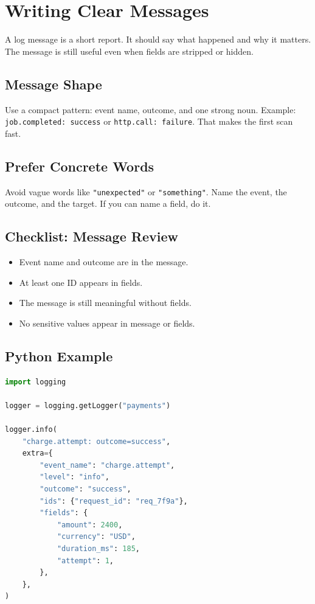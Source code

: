 \chapter{Writing Clear Messages}
A log message is a short report. It should say what happened and why it matters. The message is still useful even when fields are stripped or hidden.

\section{Message Shape}
Use a compact pattern: event name, outcome, and one strong noun. Example: \texttt{job.completed: success} or \texttt{http.call: failure}. That makes the first scan fast.

\section{Prefer Concrete Words}
Avoid vague words like \texttt{"unexpected"} or \texttt{"something"}. Name the event, the outcome, and the target. If you can name a field, do it.

\section{Checklist: Message Review}
\begin{itemize}
\item Event name and outcome are in the message.
\item At least one ID appears in fields.
\item The message is still meaningful without fields.
\item No sensitive values appear in message or fields.
\end{itemize}

\section{Python Example}
\begin{lstlisting}[language=Python]
import logging

logger = logging.getLogger("payments")

logger.info(
    "charge.attempt: outcome=success",
    extra={
        "event_name": "charge.attempt",
        "level": "info",
        "outcome": "success",
        "ids": {"request_id": "req_7f9a"},
        "fields": {
            "amount": 2400,
            "currency": "USD",
            "duration_ms": 185,
            "attempt": 1,
        },
    },
)
\end{lstlisting}


